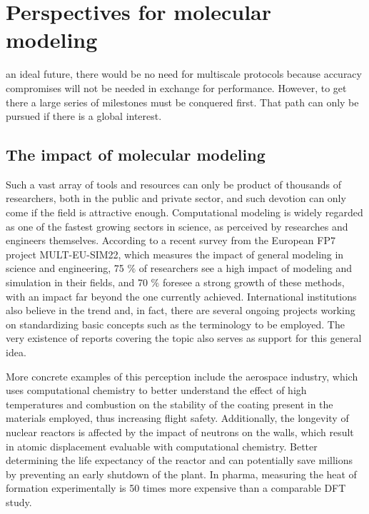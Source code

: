 \chapter{Perspectives for molecular modeling}
\label{chap:appendix-a}

 an ideal future, there would be no need for multiscale protocols because accuracy compromises will not be needed in exchange for performance. However, to get there a large series of milestones must be conquered first. That path can only be pursued if there is a global interest.

\section{The impact of molecular modeling}
\label{molecular-modeling-impact}

Such a vast array of tools and resources can only be product of thousands of researchers, both in the public and private sector, and such devotion can only come if the field is attractive enough. Computational modeling is widely regarded as one of the fastest growing sectors in science, as perceived by researches and engineers themselves. According to a recent survey from the European FP7 project MULT-EU-SIM22, which measures the impact of general modeling in science and engineering, 75 $\%$  of researchers see a high impact of modeling and simulation in their fields, and 70 $\%$  foresee a strong growth of these methods, with an impact far beyond the one currently achieved.\cite{ENN2012} International institutions also believe in the trend and, in fact, there are several ongoing projects working on standardizing basic concepts such as the terminology to be employed.\cite{cen2017} The very existence of reports covering the topic\cite{Goldbeck2012,Goldbeck2016,goldbeck2017} also serves as support for this general idea.

More concrete examples of this perception include the aerospace industry, which uses computational chemistry to better understand the effect of high temperatures and combustion on the stability of the coating present in the materials employed, thus increasing flight safety. Additionally, the longevity of nuclear reactors is affected by the impact of neutrons on the walls, which result in atomic displacement evaluable with computational chemistry. Better determining the life expectancy of the reactor and can potentially save millions by preventing an early shutdown of the plant.\cite{UKeconomics} In pharma, measuring the heat of formation experimentally is 50 times more expensive than a comparable DFT study.\cite{maginn2009}

